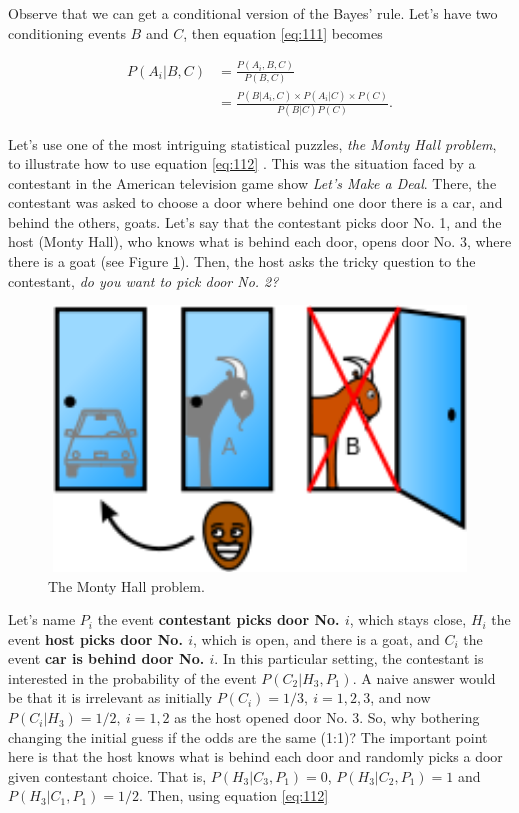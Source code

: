 Observe that we can get a conditional version of the Bayes' rule. Let's have two conditioning events $B$ and $C$, then equation \ref{eq:111} becomes

\begin{align}
	P(A_i|B,C)&=\frac{P(A_i,B,C)}{P(B,C)}\nonumber\\
	&=\frac{P(B|A_i,C) \times P(A_i|C) \times P(C)}{P(B|C)P(C)}.
	\label{eq:112}
\end{align}

Let's use one of the most intriguing statistical puzzles, \textit{the Monty Hall problem}, to illustrate how to use equation \ref{eq:112} \cite{selvin1975problem,selvin1975bproblem}. This was the situation faced by a contestant in the American television game show \textit{Let's Make a Deal}. There, the contestant was asked to choose a door where behind one door there is a car, and behind the others, goats. Let's say that the contestant picks door No. 1, and the host (Monty Hall), who knows what is behind each door, opens door No. 3, where there is a goat (see Figure \ref{fig11}). Then, the host asks the tricky question to the contestant, \textit{do you want to pick door No. 2?}

\begin{figure}
	\includegraphics[width=340pt, height=200pt]{Chapters/chapter1/figures/MHproblem.png}
	\caption[List of figure caption goes here]{The Monty Hall problem.}\label{fig11}
\end{figure}

Let's name $P_i$ the event \textbf{contestant picks door No. $i$}, which stays close, $H_i$ the event \textbf{host picks door No. $i$}, which is open, and there is a goat, and $C_i$ the event \textbf{car is behind door No. $i$}. In this particular setting, the contestant is interested in the probability of the event $P(C_2|H_3,P_1)$. A naive answer would be that it is irrelevant as initially $P(C_i)=1/3, \ i=1,2,3$, and now $P(C_i|H_3)=1/2, \ i=1,2$ as the host opened door No. 3. So, why bothering changing the initial guess if the odds are the same (1:1)? The important point here is that the host knows what is behind each door and randomly picks a door given contestant choice. That is, $P(H_3|C_3,P_1)=0$, $P(H_3|C_2,P_1)=1$ and $P(H_3|C_1,P_1)=1/2$. Then, using equation \ref{eq:112} 

